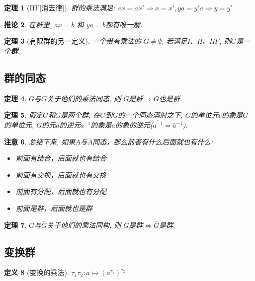 \documentclass[UTF8]{ctexart}
\newtheorem{Definition}{定义}%
\newtheorem{Theorem}[Definition]{定理}
\newtheorem{Remark}[Definition]{注意}
\newtheorem{Corollary}[Definition]{推论}
\begin{document}
\begin{Theorem}[III'\mbox{[消去律]}]
群的乘法满足: $ax = ax' \Rightarrow x = x', ya = y'a \Rightarrow y = y'$
\end{Theorem}

\begin{Corollary}
在群里, $ax = b$ 和 $ya = b$都有唯一解.
\end{Corollary}

\begin{Theorem}[有限群的另一定义]
一个带有乘法的   $G \neq \emptyset$, 若满足I、II、III', 则$G$是一个\textbf{群}.
\end{Theorem}



\subsection{群的同态}

\begin{Theorem}
$G$与$\bar{G}$关于他们的乘法同态, 则 $G$是群$\Rightarrow \bar{G}$也是群.
\end{Theorem}

\begin{Theorem}
假定$G$和$\bar{G}$是两个群, 在$G$到$\bar{G}$的一个同态满射之下, $G$的单位元$e$的象是$\bar{G}$的单位元, $G$的元$a$的逆元$a^{-1}$的象是$a$的象的逆元($\overline{a^{-1}} = \bar{a}^{-1}$).
\end{Theorem}

\begin{Remark}
总结下来, 如果$A$与$\bar{A}$同态，那么前者有什么后面就也有什么:
\begin{itemize}
	\item 前面有结合，后面就也有结合
	\item 前面有交换，后面就也有交换
	\item 前面有分配，后面就也有分配
	\item 前面是群，后面就也是群
\end{itemize}
\end{Remark}

\begin{Theorem}
$G$与$\bar{G}$关于他们的乘法同构, 则 $G$是群$\Leftrightarrow \bar{G}$是群.
\end{Theorem}

\subsection{变换群}

\begin{Definition}[变换的乘法]
$\tau_1 \tau_2: a \mapsto {\left(a^{\tau_1}\right)}^{\tau_2}$
\end{Definition}
\end{document}
